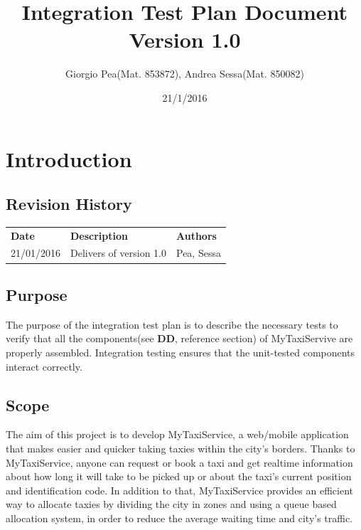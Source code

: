 \documentclass[11pt,titlepage]{article} %
\title{Integration Test Plan Document \\ \vspace{1cm} \large{Version 1.0}}
\author{Giorgio Pea(Mat. 853872), Andrea Sessa(Mat. 850082)}
\date{21/1/2016}
\begin{document}
\maketitle

\newpage

\tableofcontents

\newpage

\section{Introduction}

\subsection{Revision History}
	\begin{table}[h]
	  \centering
	  \begin{tabular}{lll}
	  \textbf{Date} & \textbf{Description} & \textbf{Authors} \\
	    21/01/2016 & Delivers of version 1.0 & Pea, Sessa
	  \end{tabular}
	\end{table}

\subsection{Purpose}
  The purpose of the integration test plan is to describe the necessary tests to verify that all the components(see \textbf{DD}, reference section)
  of MyTaxiServive are properly assembled.
  Integration testing ensures that the unit-tested components interact correctly. \newline
  
\subsection{Scope}
    The aim of this project is to develop MyTaxiService, a web/mobile application that
    makes easier and quicker taking taxies within the city’s borders. Thanks to MyTaxiService,
    anyone can request or book a taxi and get realtime information about how long
    it will take to be picked up or about the taxi’s current position and identification code.
    In addition to that, MyTaxiService provides an efficient way to allocate taxies by dividing
    the city in zones and using a queue based allocation system, in order to reduce the
    average waiting time and city’s traffic.\newline
\end{document}
